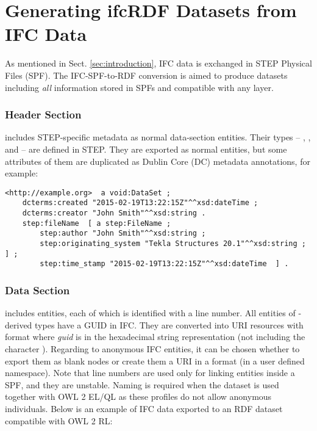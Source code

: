 
\section{Generating ifcRDF Datasets from IFC Data}
\label{sec:ifcRDF}

As mentioned in Sect. \ref{sec:introduction}, IFC data is exchanged in STEP Physical Files (SPF). The IFC-SPF-to-RDF conversion is aimed to produce \ifcrdf{} datasets including \emph{all} information stored in SPFs and compatible with any \ifcowl{} layer.

\subsubsection{Header Section} includes STEP-specific metadata as normal data-section entities. Their types -- , , and  -- are defined in STEP. They are exported as normal entities, but some attributes of them are duplicated as Dublin Core (DC) metadata annotations, for example:

\begin{lstlisting}
<http://example.org>  a void:DataSet ;
    dcterms:created "2015-02-19T13:22:15Z"^^xsd:dateTime ;
    dcterms:creator "John Smith"^^xsd:string .
    step:fileName  [ a step:FileName ;
        step:author "John Smith"^^xsd:string ;
        step:originating_system "Tekla Structures 20.1"^^xsd:string ; ] ;
        step:time_stamp "2015-02-19T13:22:15Z"^^xsd:dateTime  ] .
\end{lstlisting}


\subsubsection{Data Section} includes entities, each of which is identified with a line number.
All entities of -derived types have a GUID in IFC. They are converted into URI resources with format  where \emph{guid} is in the hexadecimal string representation (not including the character \name{\$}). Regarding to anonymous IFC entities, it can be chosen whether to export them as blank nodes or create them a URI in a format  (in a user defined namespace). Note that line numbers are used only for linking entities inside a SPF, and they are unstable. Naming is required when the dataset is used together with OWL 2 EL/QL as these profiles do not allow anonymous individuals. Below is an example of IFC data exported to an RDF dataset compatible with OWL 2 RL:

